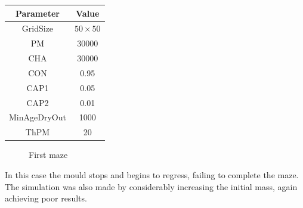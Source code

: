 \begin{center}
 \begin{tabular}{||c c||} 
 \hline
 Parameter & Value \\ [0.5ex] 
 \hline\hline
 GridSize & $50 \times 50$ \\ 
 \hline
 PM & 30000 \\ 
 \hline
 CHA & 30000 \\ 
 \hline
 CON & 0.95 \\ 
 \hline
 CAP1 & 0.05 \\ 
 \hline
 CAP2 & 0.01 \\ 
 \hline
 MinAgeDryOut & 1000 \\
 \hline
 ThPM & 20 \\ [1ex] 
 \hline
 \end{tabular}
\end{center}

\begin{figure}[H]
    \centering
    \caption{First maze}
    \label{fig:foobar}
\end{figure}

In this case the mould stops and begins to regress, failing to complete the maze. The simulation was also made by considerably increasing the initial mass, again achieving poor results.


